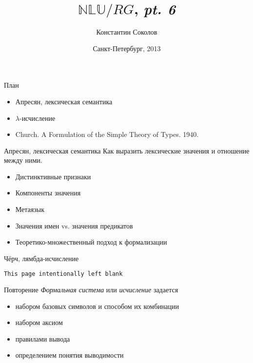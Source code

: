\documentclass{beamer}
\begin{document}
\title{\huge{$\mathbb{NLU}/RG$, \textit{pt. 6}}}
\author{Константин Соколов}
\date{Санкт-Петербург, 2013} 
\begin{frame}
    \thispagestyle{empty}
    \titlepage
\end{frame}

\begin{frame}{План}
    \setcounter{framenumber}{1}
    \begin{itemize}
        \item Апресян, лексическая семантика
        \item $\lambda$-исчисление
        \item Church. A Formulation of the Simple Theory of Types. 1940.
    \end{itemize}
\end{frame}

\begin{frame}{Апресян, лексическая семантика}
Как выразить лексические значения и отношение между ними.\\
\bigskip
\begin{itemize}
  \item Дистинктивные признаки
  \item Компоненты значения
  \item Метаязык
  \item Значения имен vs. значения предикатов
  \item Теоретико-множественный подход к формализации
\end{itemize}
\end{frame}

\begin{frame}{Чёрч, лямбда-исчисление}
\begin{center}
\texttt{This page intentionally left blank}
\end{center}
\end{frame}

\begin{frame}{Повторение}
\textit{Формальная система} или \textit{исчисление} задается\\
\begin{itemize}
  \item набором базовых символов и способом их комбинации
  \item набором аксиом
  \item правилами вывода
  \item определением понятия выводимости
\end{itemize}
\bigskip

\end{frame}
\end{document}
